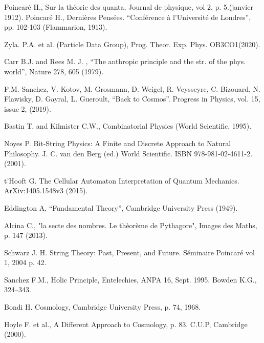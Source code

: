 \documentclass[a4paper,9pt]{article}
\begin{document}
  
\begin{thebibliography}{99}


 Poincaré H., Sur la théorie des quanta, Journal de physique, vol 2, p. 5.(janvier 1912).
 Poincaré H., Dernières Pensées. “Conférence à l’Université de Londres”, pp. 102-103 (Flammarion, 1913).



 Zyla. P.A. et al. (Particle Data Group), Prog. Theor. Exp. Phys. OB3CO1(2020).

 Carr B.J. and Rees M. J. , “The anthropic principle and the str. of the phys. world”, Nature 278, 605 (1979).


 F.M. Sanchez, V. Kotov, M. Grosmann, D. Weigel, R. Veysseyre, C. Bizouard, N. Flawisky, D. Gayral, L. Gueroult, ``Back to Cosmos''. Progress in Physics, vol. 15, issue 2, (2019).

 Bastin T. and Kilmister C.W., Combinatorial Physics (World Scientific, 1995).

 Noyes P. Bit-String Physics: A Finite and Discrete Approach to Natural Philosophy. J. C. van den Berg (ed.) World Scientific. ISBN 978-981-02-4611-2. (2001).

 t'Hooft G. The Cellular Automaton Interpretation of Quantum Mechanics. ArXiv:1405.1548v3 (2015).

 Eddington A, ``Fundamental Theory'', Cambridge University Press (1949).

 Alcina C., "la secte des nombres. Le thèorème de Pythagore", Images des Maths, p. 147 (2013).

 Schwarz J. H. String Theory: Past, Present, and Future. Séminaire Poincaré vol 1, 2004 p. 42.


 Sanchez F.M., Holic Principle, Entelechies, ANPA 16, Sept. 1995. Bowden K.G., 324--343.



 Bondi H. Cosmology, Cambridge University Press, p. 74, 1968.

 Hoyle F. et al., A Different Approach to Cosmology, p. 83. C.U.P, Cambridge (2000).


\end{thebibliography}
\end{document}
